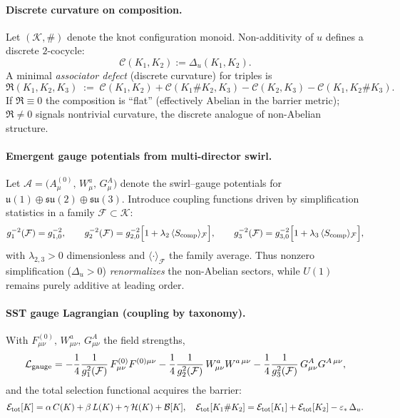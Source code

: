 \documentclass[11pt]{article}
\begin{document}
\paragraph{Discrete curvature on composition.}
    Let \((\mathcal K,\#)\) denote the knot configuration monoid. Non-additivity of \(u\) defines a discrete \(2\)-cocycle:
    \[
        \mathcal C(K_1,K_2):=\Delta_u(K_1,K_2).
    \]
    A minimal \emph{associator defect} (discrete curvature) for triples is
    \[
        \mathfrak{R}(K_1,K_2,K_3)\;:=\;
        \mathcal C(K_1,K_2)+\mathcal C(K_1\#K_2,K_3)
        -\mathcal C(K_2,K_3)-\mathcal C(K_1,K_2\#K_3).
    \]
    If \(\mathfrak{R}\equiv 0\) the composition is “flat” (effectively Abelian in the barrier metric); \(\mathfrak{R}\neq 0\) signals nontrivial curvature, the discrete analogue of non-Abelian structure.

\paragraph{Emergent gauge potentials from multi-director swirl.}
    Let \(\mathcal A=\big(A_\mu^{(0)},\,W_\mu^a,\,G_\mu^A\big)\) denote the swirl–gauge potentials for
    \(\mathfrak u(1)\oplus\mathfrak{su}(2)\oplus\mathfrak{su}(3)\).
    Introduce coupling functions driven by simplification statistics in a family \(\mathcal F\subset\mathcal K\):
    \[
        g_1^{-2}(\mathcal F)=g_{1,0}^{-2},\qquad
        g_2^{-2}(\mathcal F)=g_{2,0}^{-2}\Bigl[1+\lambda_2\,\langle S_{\rm comp}\rangle_{\mathcal F}\Bigr],
        \qquad
        g_3^{-2}(\mathcal F)=g_{3,0}^{-2}\Bigl[1+\lambda_3\,\langle S_{\rm comp}\rangle_{\mathcal F}\Bigr],
    \]
    with \(\lambda_{2,3}>0\) dimensionless and \(\langle\cdot\rangle_{\mathcal F}\) the family average.
    Thus nonzero simplification (\(\Delta_u>0\)) \emph{renormalizes} the non-Abelian sectors, while \(U(1)\) remains purely additive at leading order.

\paragraph{SST gauge Lagrangian (coupling by taxonomy).}
    With \(F_{\mu\nu}^{(0)},\,W_{\mu\nu}^a,\,G_{\mu\nu}^A\) the field strengths,
    \[
        \mathcal L_{\rm gauge}
        =-\frac{1}{4}\frac{1}{g_1^2(\mathcal F)}\,F_{\mu\nu}^{(0)}F^{(0)\mu\nu}
        -\frac{1}{4}\frac{1}{g_2^2(\mathcal F)}\,W_{\mu\nu}^{a}W^{a\,\mu\nu}
        -\frac{1}{4}\frac{1}{g_3^2(\mathcal F)}\,G_{\mu\nu}^{A}G^{A\,\mu\nu},
    \]
    and the total selection functional acquires the barrier:
    \[
        \mathcal E_{\rm tot}[K]=\alpha\,C(K)+\beta\,L(K)+\gamma\,\mathcal H(K)+\mathcal B[K],
        \quad
        \mathcal E_{\rm tot}[K_1\#K_2]
        =\mathcal E_{\rm tot}[K_1]+\mathcal E_{\rm tot}[K_2]-\varepsilon_*\,\Delta_u.
    \]
\end{document}

